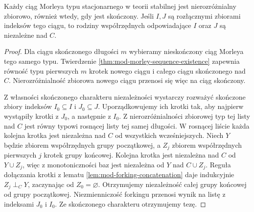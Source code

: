 \begin{wniosek}
\label{cor:mod-morley-mutual-independence}
Każdy ciąg Morleya typu stacjonarnego
w teorii stabilnej jest nierozróżnialny
zbiorowo, również wtedy, gdy jest skończony.
Jeśli $I,J$ są rozłącznymi zbiorami indeksów
tego ciągu, to rodziny współrzędnych
odpowiadające $I$ oraz $J$ są niezależne nad $C$.
\end{wniosek}
\begin{proof}
Dla ciągu skończonego długości $m$ wybieramy
nieskończony ciąg Morleya tego samego typu.
Twierdzenie \ref{thm:mod-morley-sequence-existence}
zapewnia równość typu pierwszych $m$ krotek
nowego ciągu i całego ciągu skończonego nad $C$.
Nierozróżnialność zbiorowa nowego ciągu
przenosi się więc na ciąg skończony.

Z własności skończonego charakteru niezależności
wystarczy rozważyć skończone zbiory indeksów
$I_0\subseteq I$ i $J_0\subseteq J$.
Uporządkowujemy ich krotki tak, aby najpierw
wystąpiły krotki z $J_0$, a następnie z $I_0$.
Z nierozróżnialności zbiorowej typ tej listy
nad $C$ jest równy typowi rosnącej listy
tej samej długości. W rosnącej liście każda
kolejna krotka jest niezależna nad $C$
od wszystkich wcześniejszych.
Niech $Y$ będzie zbiorem współrzędnych grupy
początkowej, a $Z_j$ zbiorem współrzędnych
pierwszych $j$ krotek grupy końcowej.
Kolejna krotka jest niezależna nad $C$
od $Y\cup Z_j$, więc z monotoniczności baz
jest niezależna od $Y$ nad $C\cup Z_j$.
Reguła dołączania krotki z lematu
\ref{lem:mod-forking-concatenation} daje
indukcyjnie $Z_j\mathrel{\perp_C}Y$,
zaczynając od $Z_0=\varnothing$.
Otrzymujemy niezależność całej grupy końcowej
od grupy początkowej.
Niezmienniczość forkingu przenosi wynik
na listę z indeksami $J_0$ i $I_0$.
Ze skończonego charakteru otrzymujemy tezę.
\end{proof}

